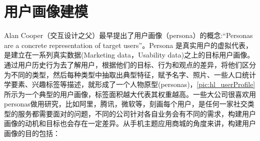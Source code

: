 
\chapter{用户画像建模}
\label{chap:example}
Alan Cooper（交互设计之父）最早提出了用户画像（persona）的概念:“Personas are a concrete representation of target users”。Persona 是真实用户的虚拟代表，是建立在一系列真实数据(Marketing data，Usability data)之上的目标用户画像。通过用户历史行为去了解用户，根据他们的目标、行为和观点的差异，将他们区分为不同的类型，然后每种类型中抽取出典型特征，赋予名字、照片、一些人口统计学要素、兴趣标签等描述，就形成了一个人物原型(personas)，\autoref{pic:hl_userProfile}所示为一个典型的用户画像，标签面积越大代表其权重越高。一些大公司很喜欢用personas做用研究，比如阿里，腾讯，微软等，刻画每个用户，是任何一家社交类型的服务都需要面对的问题，不同的公司针对各自业务会有不同的需求，构建用户画像的动机和目标也会存在一定差异。从手机主题应用商城的角度来讲，构建用户画像的目的包括：

\begin{figure}
\centering
  \label{pic:hl_userProfile}
\end{figure}

